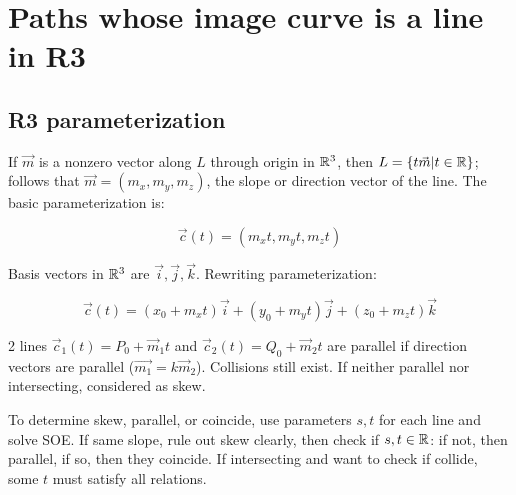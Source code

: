 \section{Paths whose image curve is a line in R3}

\subsection{R3 parameterization}

If $\vec{m}$ is a nonzero vector along $L$ through origin in $\mathbb{R}^3$, then $L=\{t\vec{m}|t\in\mathbb{R}\}$;
follows that $\vec{m}=(m_x,m_y,m_z)$, the slope or direction vector of the line. The basic parameterization is:

\[\vec{c}(t)=(m_x t,m_y t,m_z t)\]

Basis vectors in $\mathbb{R}^3$ are $\vec{i}, \vec{j}, \vec{k}$. Rewriting parameterization: 

\[\vec{c}(t)=(x_0+m_x t) \vec{i}+(y_0+m_y t) \vec{j}+(z_0+m_z t) \vec{k}\]

2 lines $\vec{c}_1(t)=P_0+\vec{m}_1t$ and $\vec{c}_2(t)=Q_0+\vec{m}_2t$ are parallel if
direction vectors are parallel ($\vec{m_1}=k\vec{m}_2$). Collisions still exist. If neither parallel nor intersecting, considered as skew.\newline

\noindent
To determine skew, parallel, or coincide, use parameters $s,t$ for each line and solve SOE.
If same slope, rule out skew clearly, then check if $s,t\in\mathbb{R}$: if not, then parallel, if so, then they coincide. If intersecting and want to check if collide, some $t$
must satisfy all relations.